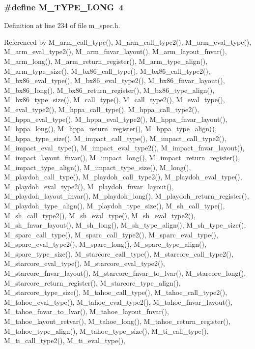 \subsubsection{\setlength{\rightskip}{0pt plus 5cm}\#define M\_\-TYPE\_\-LONG~4}\label{m__spec_8h_7e64e370ae149dfc36e3bf1f14dde5a3}




Definition at line 234 of file m\_\-spec.h.

Referenced by M\_\-arm\_\-call\_\-type(), M\_\-arm\_\-call\_\-type2(), M\_\-arm\_\-eval\_\-type(), M\_\-arm\_\-eval\_\-type2(), M\_\-arm\_\-fnvar\_\-layout(), M\_\-arm\_\-layout\_\-fnvar(), M\_\-arm\_\-long(), M\_\-arm\_\-return\_\-register(), M\_\-arm\_\-type\_\-align(), M\_\-arm\_\-type\_\-size(), M\_\-bx86\_\-call\_\-type(), M\_\-bx86\_\-call\_\-type2(), M\_\-bx86\_\-eval\_\-type(), M\_\-bx86\_\-eval\_\-type2(), M\_\-bx86\_\-fnvar\_\-layout(), M\_\-bx86\_\-long(), M\_\-bx86\_\-return\_\-register(), M\_\-bx86\_\-type\_\-align(), M\_\-bx86\_\-type\_\-size(), M\_\-call\_\-type(), M\_\-call\_\-type2(), M\_\-eval\_\-type(), M\_\-eval\_\-type2(), M\_\-hppa\_\-call\_\-type(), M\_\-hppa\_\-call\_\-type2(), M\_\-hppa\_\-eval\_\-type(), M\_\-hppa\_\-eval\_\-type2(), M\_\-hppa\_\-fnvar\_\-layout(), M\_\-hppa\_\-long(), M\_\-hppa\_\-return\_\-register(), M\_\-hppa\_\-type\_\-align(), M\_\-hppa\_\-type\_\-size(), M\_\-impact\_\-call\_\-type(), M\_\-impact\_\-call\_\-type2(), M\_\-impact\_\-eval\_\-type(), M\_\-impact\_\-eval\_\-type2(), M\_\-impact\_\-fnvar\_\-layout(), M\_\-impact\_\-layout\_\-fnvar(), M\_\-impact\_\-long(), M\_\-impact\_\-return\_\-register(), M\_\-impact\_\-type\_\-align(), M\_\-impact\_\-type\_\-size(), M\_\-long(), M\_\-playdoh\_\-call\_\-type(), M\_\-playdoh\_\-call\_\-type2(), M\_\-playdoh\_\-eval\_\-type(), M\_\-playdoh\_\-eval\_\-type2(), M\_\-playdoh\_\-fnvar\_\-layout(), M\_\-playdoh\_\-layout\_\-fnvar(), M\_\-playdoh\_\-long(), M\_\-playdoh\_\-return\_\-register(), M\_\-playdoh\_\-type\_\-align(), M\_\-playdoh\_\-type\_\-size(), M\_\-sh\_\-call\_\-type(), M\_\-sh\_\-call\_\-type2(), M\_\-sh\_\-eval\_\-type(), M\_\-sh\_\-eval\_\-type2(), M\_\-sh\_\-fnvar\_\-layout(), M\_\-sh\_\-long(), M\_\-sh\_\-type\_\-align(), M\_\-sh\_\-type\_\-size(), M\_\-sparc\_\-call\_\-type(), M\_\-sparc\_\-call\_\-type2(), M\_\-sparc\_\-eval\_\-type(), M\_\-sparc\_\-eval\_\-type2(), M\_\-sparc\_\-long(), M\_\-sparc\_\-type\_\-align(), M\_\-sparc\_\-type\_\-size(), M\_\-starcore\_\-call\_\-type(), M\_\-starcore\_\-call\_\-type2(), M\_\-starcore\_\-eval\_\-type(), M\_\-starcore\_\-eval\_\-type2(), M\_\-starcore\_\-fnvar\_\-layout(), M\_\-starcore\_\-fnvar\_\-to\_\-lvar(), M\_\-starcore\_\-long(), M\_\-starcore\_\-return\_\-register(), M\_\-starcore\_\-type\_\-align(), M\_\-starcore\_\-type\_\-size(), M\_\-tahoe\_\-call\_\-type(), M\_\-tahoe\_\-call\_\-type2(), M\_\-tahoe\_\-eval\_\-type(), M\_\-tahoe\_\-eval\_\-type2(), M\_\-tahoe\_\-fnvar\_\-layout(), M\_\-tahoe\_\-fnvar\_\-to\_\-lvar(), M\_\-tahoe\_\-layout\_\-fnvar(), M\_\-tahoe\_\-layout\_\-retvar(), M\_\-tahoe\_\-long(), M\_\-tahoe\_\-return\_\-register(), M\_\-tahoe\_\-type\_\-align(), M\_\-tahoe\_\-type\_\-size(), M\_\-ti\_\-call\_\-type(), M\_\-ti\_\-call\_\-type2(), M\_\-ti\_\-eval\_\-type(), 
